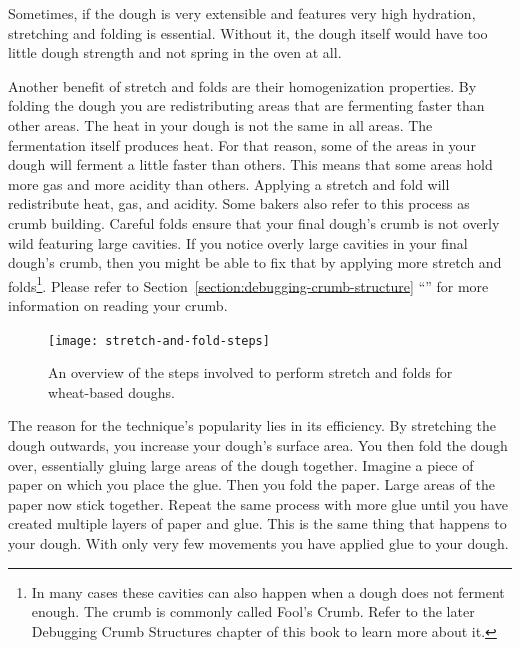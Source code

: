 Sometimes, if the dough is very extensible
and features very high hydration, stretching and folding is essential.
Without it, the dough itself would have too little dough strength and not
spring in the oven at all.

Another benefit of stretch and folds are their homogenization properties. By
folding the dough you are redistributing areas that are fermenting faster
than other areas. The heat in your dough is not the same in all areas.
The fermentation itself produces heat. For that reason, some of the areas in
your dough will ferment a little faster than others. This means that some
areas hold more gas and more acidity than others. Applying a stretch and fold
will redistribute heat, gas, and acidity. Some bakers also refer to this
process as crumb building. Careful folds ensure that your final dough's crumb
is not overly wild featuring large cavities. If you notice overly
large cavities in your final dough's crumb, then you might be able to fix that
by applying more stretch and folds\footnote{In many cases these cavities can
also happen when a dough does not ferment enough. The crumb is commonly called
Fool's Crumb. Refer to the later Debugging Crumb Structures chapter of this
book to learn more about it.}. Please refer to Section~\ref{section:debugging-crumb-structure}
``'' for more information on reading
your crumb.

\begin{figure}[!htb]
  \texttt{[image: stretch-and-fold-steps]}
  \caption[Stretch and fold steps]{An overview of the steps involved to perform
      stretch and folds for wheat-based doughs.}%
  \label{figure:stretch-and-fold-steps}
\end{figure}

The reason for the technique's popularity lies in its efficiency. By stretching
the dough outwards, you increase your dough's surface area. You then fold the
dough over, essentially gluing large areas of the dough together. Imagine a
piece of paper on which you place the glue. Then you fold the paper. Large areas
of the paper now stick together. Repeat the same process with more glue until
you have created multiple layers of paper and glue. This is the same thing that
happens to your dough. With only very few movements you have applied glue to your
dough.

